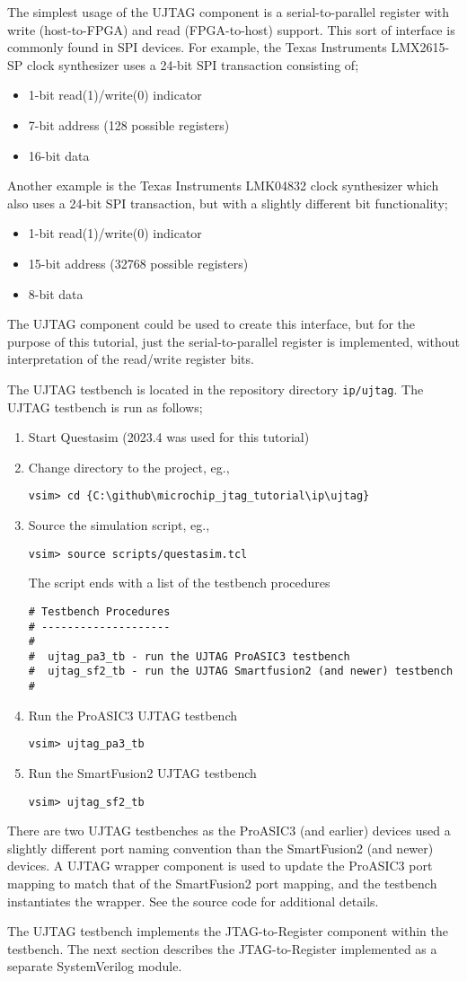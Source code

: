 The simplest usage of the UJTAG component is a serial-to-parallel register
with write (host-to-FPGA) and read (FPGA-to-host) support. This sort of
interface is commonly found in SPI devices. For example, the Texas Instruments
LMX2615-SP clock synthesizer uses a 24-bit SPI transaction consisting of;
%
\begin{itemize}
\item 1-bit read(1)/write(0) indicator
\item 7-bit address (128 possible registers)
\item 16-bit data
\end{itemize}
%
Another example is the Texas Instruments LMK04832 clock synthesizer which
also uses a 24-bit SPI transaction, but with a slightly different bit
functionality;
%
\begin{itemize}
\item 1-bit read(1)/write(0) indicator
\item 15-bit address (32768 possible registers)
\item 8-bit data
\end{itemize}
%
The UJTAG component could be used to create this interface, but for the
purpose of this tutorial, just the serial-to-parallel register is
implemented, without interpretation of the read/write register bits.

The UJTAG testbench is located in the repository directory \verb+ip/ujtag+.
The UJTAG testbench is run as follows;
%
\begin{enumerate}
\item Start Questasim (2023.4 was used for this tutorial)
\item Change directory to the project, eg.,
\begin{verbatim}
vsim> cd {C:\github\microchip_jtag_tutorial\ip\ujtag}
\end{verbatim}
\item Source the simulation script, eg.,
\begin{verbatim}
vsim> source scripts/questasim.tcl
\end{verbatim}
The script ends with a list of the testbench procedures
\begin{verbatim}
# Testbench Procedures
# --------------------
#
#  ujtag_pa3_tb - run the UJTAG ProASIC3 testbench
#  ujtag_sf2_tb - run the UJTAG Smartfusion2 (and newer) testbench
#
\end{verbatim}
\item Run the ProASIC3 UJTAG testbench
\begin{verbatim}
vsim> ujtag_pa3_tb
\end{verbatim}
\item Run the SmartFusion2 UJTAG testbench
\begin{verbatim}
vsim> ujtag_sf2_tb
\end{verbatim}
\end{enumerate}
%
There are two UJTAG testbenches as the ProASIC3 (and earlier) devices used
a slightly different port naming convention than the SmartFusion2 (and newer)
devices. A UJTAG wrapper component is used to update the ProASIC3 port mapping
to match that of the SmartFusion2 port mapping, and the testbench instantiates
the wrapper. See the source code for additional details.

The UJTAG testbench implements the JTAG-to-Register component within the
testbench. The next section describes the JTAG-to-Register implemented as
a separate SystemVerilog module.
